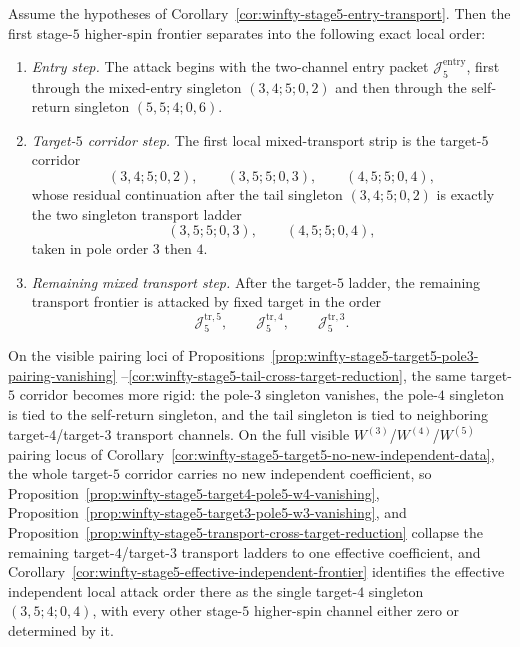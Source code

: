 \begin{proposition}
\label{prop:winfty-stage5-local-attack-order}
Assume the hypotheses of
Corollary~\ref{cor:winfty-stage5-entry-transport}.  Then the first
stage-$5$ higher-spin frontier separates into the following exact local
order:
\begin{enumerate}[label=\textup{(\roman*)}]
\item \emph{Entry step.}  The attack begins with the two-channel entry
  packet \(\mathcal{J}_5^{\mathrm{entry}}\), first through the
  mixed-entry singleton \((3,4;5;0,2)\) and then through the
  self-return singleton \((5,5;4;0,6)\).
\item \emph{Target-$5$ corridor step.}  The first local mixed-transport
  strip is the target-$5$ corridor
  \[
  (3,4;5;0,2),\qquad
  (3,5;5;0,3),\qquad
  (4,5;5;0,4),
  \]
  whose residual continuation after the tail singleton
  \((3,4;5;0,2)\) is exactly the two singleton transport ladder
  \[
  (3,5;5;0,3),\qquad
  (4,5;5;0,4),
  \]
  taken in pole order \(3\) then \(4\).
\item \emph{Remaining mixed transport step.}  After the target-$5$
  ladder, the remaining transport frontier is attacked by fixed target
  in the order
  \[
  \mathcal{J}_5^{\mathrm{tr},5},\qquad
  \mathcal{J}_5^{\mathrm{tr},4},\qquad
  \mathcal{J}_5^{\mathrm{tr},3}.
  \]
\end{enumerate}
On the visible pairing loci of
Propositions~\ref{prop:winfty-stage5-target5-pole3-pairing-vanishing}
--\ref{cor:winfty-stage5-tail-cross-target-reduction}, the same
target-$5$ corridor becomes more rigid: the pole-$3$ singleton
vanishes, the pole-$4$ singleton is tied to the self-return singleton,
and the tail singleton is tied to neighboring target-$4$/target-$3$
transport channels.  On the full visible
\texorpdfstring{$W^{(3)}$}{W3}/\texorpdfstring{$W^{(4)}$}{W4}/\texorpdfstring{$W^{(5)}$}{W5}
pairing locus of
Corollary~\ref{cor:winfty-stage5-target5-no-new-independent-data}, the
whole target-$5$ corridor carries no new independent coefficient, so
Proposition~\ref{prop:winfty-stage5-target4-pole5-w4-vanishing},
Proposition~\ref{prop:winfty-stage5-target3-pole5-w3-vanishing}, and
Proposition~\ref{prop:winfty-stage5-transport-cross-target-reduction}
collapse the remaining target-$4$/target-$3$ transport ladders to one
effective coefficient, and
Corollary~\ref{cor:winfty-stage5-effective-independent-frontier}
identifies the effective independent local attack order there as the
single target-$4$ singleton \((3,5;4;0,4)\), with every other stage-$5$
higher-spin channel either zero or determined by it.
\end{proposition}

